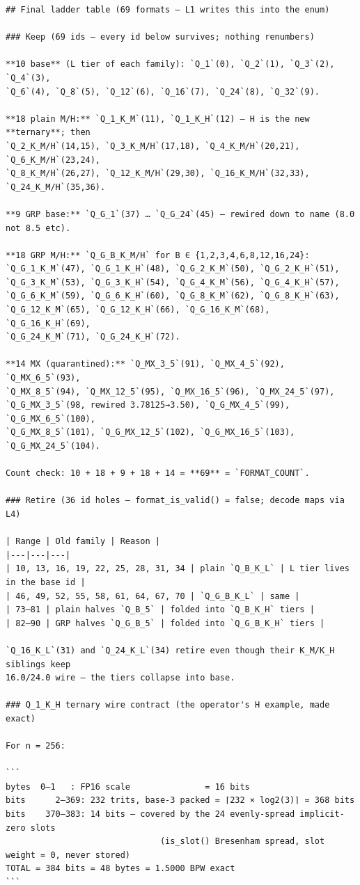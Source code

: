 \begin{verbatim}
## Final ladder table (69 formats — L1 writes this into the enum)

### Keep (69 ids — every id below survives; nothing renumbers)

**10 base** (L tier of each family): `Q_1`(0), `Q_2`(1), `Q_3`(2), `Q_4`(3),
`Q_6`(4), `Q_8`(5), `Q_12`(6), `Q_16`(7), `Q_24`(8), `Q_32`(9).

**18 plain M/H:** `Q_1_K_M`(11), `Q_1_K_H`(12) — H is the new **ternary**; then
`Q_2_K_M/H`(14,15), `Q_3_K_M/H`(17,18), `Q_4_K_M/H`(20,21), `Q_6_K_M/H`(23,24),
`Q_8_K_M/H`(26,27), `Q_12_K_M/H`(29,30), `Q_16_K_M/H`(32,33), `Q_24_K_M/H`(35,36).

**9 GRP base:** `Q_G_1`(37) … `Q_G_24`(45) — rewired down to name (8.0 not 8.5 etc).

**18 GRP M/H:** `Q_G_B_K_M/H` for B ∈ {1,2,3,4,6,8,12,16,24}:
`Q_G_1_K_M`(47), `Q_G_1_K_H`(48), `Q_G_2_K_M`(50), `Q_G_2_K_H`(51),
`Q_G_3_K_M`(53), `Q_G_3_K_H`(54), `Q_G_4_K_M`(56), `Q_G_4_K_H`(57),
`Q_G_6_K_M`(59), `Q_G_6_K_H`(60), `Q_G_8_K_M`(62), `Q_G_8_K_H`(63),
`Q_G_12_K_M`(65), `Q_G_12_K_H`(66), `Q_G_16_K_M`(68), `Q_G_16_K_H`(69),
`Q_G_24_K_M`(71), `Q_G_24_K_H`(72).

**14 MX (quarantined):** `Q_MX_3_5`(91), `Q_MX_4_5`(92), `Q_MX_6_5`(93),
`Q_MX_8_5`(94), `Q_MX_12_5`(95), `Q_MX_16_5`(96), `Q_MX_24_5`(97),
`Q_G_MX_3_5`(98, rewired 3.78125→3.50), `Q_G_MX_4_5`(99), `Q_G_MX_6_5`(100),
`Q_G_MX_8_5`(101), `Q_G_MX_12_5`(102), `Q_G_MX_16_5`(103), `Q_G_MX_24_5`(104).

Count check: 10 + 18 + 9 + 18 + 14 = **69** = `FORMAT_COUNT`.

### Retire (36 id holes — format_is_valid() = false; decode maps via L4)

| Range | Old family | Reason |
|---|---|---|
| 10, 13, 16, 19, 22, 25, 28, 31, 34 | plain `Q_B_K_L` | L tier lives in the base id |
| 46, 49, 52, 55, 58, 61, 64, 67, 70 | `Q_G_B_K_L` | same |
| 73–81 | plain halves `Q_B_5` | folded into `Q_B_K_H` tiers |
| 82–90 | GRP halves `Q_G_B_5` | folded into `Q_G_B_K_H` tiers |

`Q_16_K_L`(31) and `Q_24_K_L`(34) retire even though their K_M/K_H siblings keep
16.0/24.0 wire — the tiers collapse into base.

### Q_1_K_H ternary wire contract (the operator's H example, made exact)

For n = 256:

```
bytes  0–1   : FP16 scale               = 16 bits
bits      2–369: 232 trits, base-3 packed = ⌈232 × log2(3)⌉ = 368 bits
bits    370–383: 14 bits — covered by the 24 evenly-spread implicit-zero slots
                               (is_slot() Bresenham spread, slot weight = 0, never stored)
TOTAL = 384 bits = 48 bytes = 1.5000 BPW exact
```


\end{verbatim}
